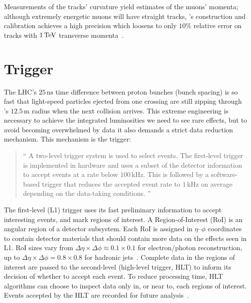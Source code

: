 Measurements of the tracks' curvature yield estimates of the muons' momenta;
although extremely energetic muons will have straight tracks,
\atlas's construction and calibration achieves a high precision which
loosens to only $10\%$ relative error on tracks with $1\,\eV[T]$ transverse
momenta~\cite{
atlas1994proposal,
atlas2008experiment,
ATL-PHYS-PUB-2015-037
}.


\section{Trigger}
\label{sec:atlas_trigger}
The LHC's $25\,\mathrm{ns}$ time difference between proton bunches
(bunch spacing) is so fast that light-speed particles ejected from one crossing
are still zipping through \atlas's $12.5\,\textrm{m}$ radius when the next
collision arrives.
This extreme engineering is necessary to achieve the integrated luminosities we
need to see rare effects, but to avoid becoming overwhelmed
by data it also demands a strict data reduction mechanism.
This mechanism is the trigger:
\begin{quote}
``%
A two-level trigger system is used to select events.
The first-level trigger is implemented in hardware and uses a subset of the
detector information to accept events at a rate below $100\,\mathrm{kHz}$.
This is followed by a software-based trigger that reduces the accepted event
rate to $1\,\mathrm{kHz}$ on average depending on the data-taking conditions.%
''~\cite{atlas2022searches}
\end{quote}
The first-level (L1) trigger uses its fast preliminary information to accept
interesting events, and mark regions of interest.
A Region-of-Interest (RoI) is an angular region of a detector subsystem.
Each RoI is assigned in $\eta\textrm{--}\phi$ coordinates to contain detector materials
that should contain more data on the effects seen in L1.
RoI sizes vary from
$\Delta\eta \times \Delta\phi \approx 0.1 \times 0.1$ for electron/photon
reconstruction, up to
$\Delta\eta \times \Delta\phi = 0.8 \times 0.8$ for
hadronic jets~\cite{atlas2016trigger}.
Complete data in the regions of interest are passed to the second-level
(high-level trigger, HLT) to inform its decision of whether to accept each
event.
To reduce processing time, HLT algorithms can choose to inspect data only in,
or near to, each regions of interest.
Events accepted by the HLT are recorded for future analysis~\cite{
atlas2016trigger,
atlas2008experiment
}.


